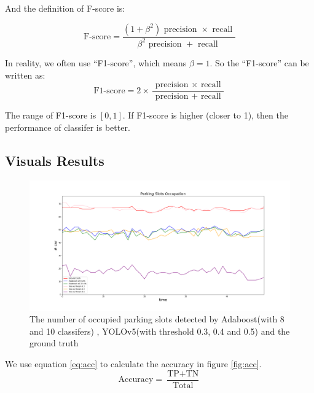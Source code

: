 \documentclass{article}[12pt]
\begin{document}
And the definition of F-score is:

\begin{equation}
    \text {F-score}=\frac{\left(1+\beta^{2}\right) \text { precision } \times \text { recall }}{\beta^{2} \text { precision }+\text { recall }}
\end{equation}

In reality, we often use ``F1-score'', which means $\beta=1$. So the ``F1-score'' can be written as:
\begin{equation}
    \text {F1-score}=2 \times \frac{\text { precision } \times \text { recall }}{\text { precision }+\text { recall }}
\end{equation}

The range of F1-score is $[0, 1]$. If F1-score is higher (closer to 1), 
then the performance of classifer is better.




\subsection{Visuals Results}



\begin{figure}[H]
    \centering
    \includegraphics[width=\textwidth]{figure/Parking_Slots_Occupation.png}
    \caption{The number of occupied parking slots detected by Adaboost(with 8 and 10 classifers)
    , YOLOv5(with threshold 0.3, 0.4 and 0.5) and the ground truth}
\end{figure}

We use equation \ref{eq:acc} to calculate the accuracy in figure \ref{fig:acc}.
\begin{equation}
    \text{Accuracy} = \frac{\text{TP}+\text{TN}}{\text{Total}}
    \label{eq:acc}
\end{equation}
\end{document}
